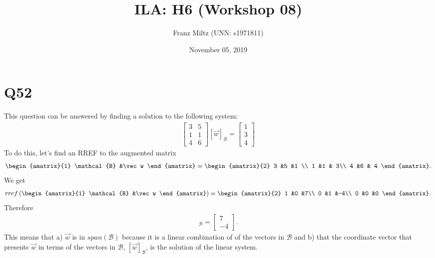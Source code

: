 \documentclass{article}
\title{ILA: H6 (Workshop 08)}
\author{Franz Miltz (UNN: s1971811)}
\date{November 05, 2019}
\begin{document}
\maketitle
\section*{Q52}
This question can be answered by finding a solution to the following system:
\begin{align*}
    \begin{bmatrix}
        3 & 5 \\ 1 & 1\\ 4 &6
    \end{bmatrix}
    [\vec w]_{\mathcal{B}} =
    \begin{bmatrix}
        1 \\ 3 \\4
    \end{bmatrix}
\end{align*}
To do this, let's find an RREF to the augmented matrix
\begin{align*}
    \begin{amatrix}{1}
        \mathcal{B} &\vec w
    \end{amatrix} =
    \begin{amatrix}{2}
        3 &5 &1 \\
        1 &1 & 3\\
        4 &6 & 4
    \end{amatrix}.
\end{align*}
We get
\begin{align*}
    rref\left(
    \begin{amatrix}{1}
        \mathcal{B} &\vec w
    \end{amatrix}\right)=
    \begin{amatrix}{2}
        1 &0 &7\\
        0 &1 &-4\\
        0 &0 &0
    \end{amatrix}.
\end{align*}
Therefore
\begin{align*}
    [\vec w]_\mathcal{B} = \begin{bmatrix}
        7 \\ -4
    \end{bmatrix}.
\end{align*}
This means that a) $\vec w$ is in $span(\mathcal{B})$ because it is a linear combination of of the vectors in $\mathcal{B}$ and b) that the coordinate vector that presents $\vec w$ in terms of the vectors in $\mathcal{B}$, $[\vec w]_\mathcal{B}$, is the solution of the linear system.
\end{document}
